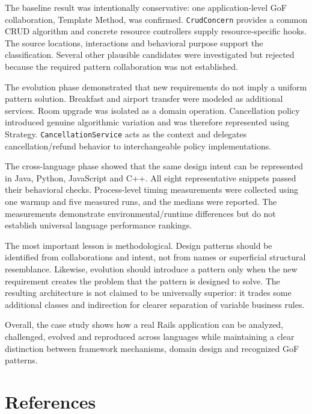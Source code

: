 \documentclass[10pt,a4paper]{article}
\newcommand{\code}[1]{\texttt{\small #1}}
\begin{document}
The baseline result was intentionally conservative: one application-level GoF collaboration, Template Method, was confirmed. \code{CrudConcern} provides a common CRUD algorithm and concrete resource controllers supply resource-specific hooks. The source locations, interactions and behavioral purpose support the classification. Several other plausible candidates were investigated but rejected because the required pattern collaboration was not established.

The evolution phase demonstrated that new requirements do not imply a uniform pattern solution. Breakfast and airport transfer were modeled as additional services. Room upgrade was isolated as a domain operation. Cancellation policy introduced genuine algorithmic variation and was therefore represented using Strategy. \code{CancellationService} acts as the context and delegates cancellation/refund behavior to interchangeable policy implementations.

The cross-language phase showed that the same design intent can be represented in Java, Python, JavaScript and C++. All eight representative snippets passed their behavioral checks. Process-level timing measurements were collected using one warmup and five measured runs, and the medians were reported. The measurements demonstrate environmental/runtime differences but do not establish universal language performance rankings.

The most important lesson is methodological. Design patterns should be identified from collaborations and intent, not from names or superficial structural resemblance. Likewise, evolution should introduce a pattern only when the new requirement creates the problem that the pattern is designed to solve. The resulting architecture is not claimed to be universally superior: it trades some additional classes and indirection for clearer separation of variable business rules.

Overall, the case study shows how a real Rails application can be analyzed, challenged, evolved and reproduced across languages while maintaining a clear distinction between framework mechanisms, domain design and recognized GoF patterns.

\section{References}
\end{document}
